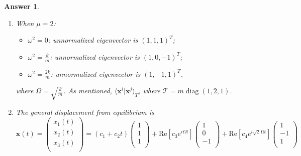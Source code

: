 \documentclass[a4paper]{article}
\DeclareMathOperator{\diag}{diag}
\newtheorem{ans}{Answer}[section]
\theoremstyle{new}
\begin{document}
\begin{ans}
\begin{enumerate}[label=(\alph*)]
\begin{enumerate}[label=(\roman*)]
\begin{align}
\end{align}
which has solutions $\omega^2=0$, $\omega^2=\frac{k}{m}$ and $\omega^2=\frac{k}{m}(1+\frac{2}{\mu})$. By inspection, the eigenvectors respectively are $(1,1,1)^T$, $(1,0,-1)^T$ and $(1,-2/\mu,1)^T$. Normalization is taken with an inner product with respect to the kinetic energy matrix $\diag(m,\mu m,m)$. Thus, the modes are
\begin{itemize}
    \item $\omega^2=0$: normalized eigenvector is $\frac{1}{\sqrt{m(2+\mu)}}(1,1,1)^T$, which correspond to a linear translation of the system at some constant velocity;
    \item $\omega^2=\frac{k}{m}$: normalized eigenvector is $\frac{1}{\sqrt{2m}}(1,0,-1)^T$, which correspond to the central mass being stationary and the outer two to oscillate in phase but with equal amplitudes;
    \item $\omega^2=\frac{k}{m}(1+\frac{2}{\mu})$: normalized eigenvector is $\frac{1}{\sqrt{m(2+\frac{4}{\mu})}}(1,-2/\mu,1)^T$, which correspond to the outer two mass to oscillate in phase with equal amplitudes and central mass to oscillate in anti-phase with a relative amplitude of $\frac{2}{\mu}$.
\end{itemize}
\end{enumerate}
\item When $\mu=2$:
\begin{itemize}
    \item $\omega^2=0$: unnormalized eigenvector is $(1,1,1)^T$;
    \item $\omega^2=\frac{k}{m}$: unnormalized eigenvector is $(1,0,-1)^T$;
    \item $\omega^2=\frac{2k}{m}$: unnormalized eigenvector is $(1,-1,1)^T$.
\end{itemize}
where $\Omega=\sqrt{\frac{k}{m}}$. As mentioned, $\langle\mathbf{x}^i|\mathbf{x}^j\rangle_T$, where $\mathcal{T}=m\diag(1,2,1)$.
\item The general displacement from equilibrium is
$$\mathbf{x}(t)=\begin{pmatrix}x_1(t)\\x_2(t)\\x_3(t)\\\end{pmatrix}=(c_1+c_2t)\begin{pmatrix}1\\1\\1\\\end{pmatrix}+\text{Re}[c_3e^{i\Omega t}]\begin{pmatrix}1\\0\\-1\\\end{pmatrix}+\text{Re}[c_4e^{i\sqrt{2}\Omega t}]\begin{pmatrix}1\\-1\\1\\\end{pmatrix}$$

\end{enumerate}
\end{ans}
\end{document}
